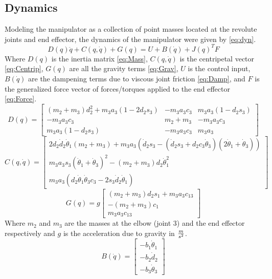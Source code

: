 \documentclass[letterpaper,12pt]{report}
\begin{document}
\subsection{Dynamics}
Modeling the manipulator as a collection of point masses located at the revolute joints and end effector,
the dynamics of the manipulator were given by \eqref{eq:dyn}.
\begin{equation} \label{eq:dyn}
D(q)\ddot q + C(q,\dot q) + G(q) = U + B(\dot q) + J(q)^TF
\end{equation}
Where $D(q)$ is the inertia matrix \eqref{eq:Mass}, $C(q,\dot q)$ is the centripetal vector \eqref{eq:Centrip}, $G(q)$ are all the gravity terms 
\eqref{eq:Grav}, $U$ is the control input, $B(\dot q)$ are the dampening terms due to viscous joint friction \eqref{eq:Damp}, and $F$ is the generalized force vector of 
forces/torques applied to the end effector \eqref{eq:Force}.
\begin{equation} \label{eq:Mass}
D(q) = 
	\begin{bmatrix}
		(m_2+m_3)d_2^2+m_3a_3(1-2d_2s_3)&-m_3a_3c_3&m_3a_3(1-d_2s_3)\\
		-m_3a_3c_3&m_2+m_3&-m_3a_3c_3\\
		m_3a_3(1-d_2s_3)&-m_3a_3c_3&m_3a_3
	\end{bmatrix}
\end{equation}
\begin{equation} \label{eq:Centrip}
C(q,\dot q) = 
	\begin{bmatrix}
		2d_2\dot d_2 \dot\theta_1(m_2+m_3) + m_3a_3(\dot d_2s_3-(\dot d_2s_3+d_2c_3\dot\theta_3)(2\dot\theta_1+\dot\theta_3))\\
		m_3a_3s_3(\dot\theta_1+\dot\theta_3)^2 - (m_2+m_3)d_2\dot\theta_1^2\\
		m_3a_3(d_2\dot\theta_1\dot\theta_3c_3 - 2s_3\dot d_2\dot\theta_1)
	\end{bmatrix}
\end{equation}
\begin{equation} \label{eq:Grav}
G(q) = g
	\begin{bmatrix}
		(m_2+m_3)d_2s_1 + m_3a_3c_{13}\\
		-(m_2+m_3)c_1\\
		m_3a_3c_{13}
	\end{bmatrix}
\end{equation}
Where $m_2$ and $m_3$ are the masses at the elbow (joint 3) and the end effector respectively and $g$ is the acceleration due to gravity in $m\over s^2$.
\begin{equation} \label{eq:Damp}
B(\dot q) = 
	\begin{bmatrix}
		-b_1\dot\theta_1\\
		-b_2\dot d_2\\
		-b_3\dot\theta_3
	\end{bmatrix}
\end{equation}
\end{document}

